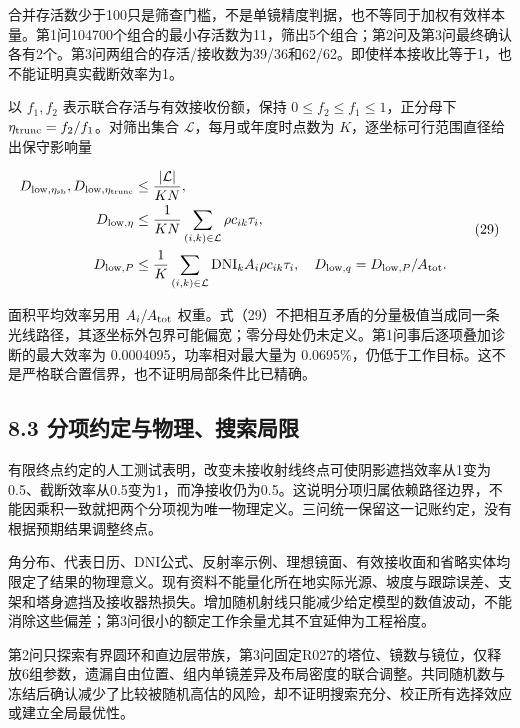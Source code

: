 \documentclass[UTF8,fontset=windows,zihao=-4]{ctexart}
\begin{document}
合并存活数少于100只是筛查门槛，不是单镜精度判据，也不等同于加权有效样本量。第1问104700个组合的最小存活数为11，筛出5个组合；第2问及第3问最终确认各有2个。第3问两组合的存活/接收数为39/36和62/62。即使样本接收比等于1，也不能证明真实截断效率为1。

\par\noindent\begin{minipage}{\linewidth}
以 \(f_1,f_2\) 表示联合存活与有效接收份额，保持 \(0\le f_2\le f_1\le1\)，正分母下 \(\eta_{\rm trunc}=f_2/f_1\)。对筛出集合 \(\mathcal L\)，每月或年度时点数为 \(K\)，逐坐标可行范围直径给出保守影响量

\[
\begin{aligned}
D_{{\rm low},\eta_{\rm sb}},D_{{\rm low},\eta_{\rm trunc}}&\le\frac{|\mathcal L|}{KN},\\
D_{{\rm low},\eta}&\le\frac1{KN}\sum_{(i,k)\in\mathcal L}\rho c_{ik}\tau_i,\\
D_{{\rm low},P}&\le\frac1K\sum_{(i,k)\in\mathcal L}\mathrm{DNI}_kA_i\rho c_{ik}\tau_i,
\quad D_{{\rm low},q}=D_{{\rm low},P}/A_{\rm tot}.
\end{aligned}\tag{29}
\]
\end{minipage}\par

面积平均效率另用 \(A_i/A_{\rm tot}\) 权重。式（29）不把相互矛盾的分量极值当成同一条光线路径，其逐坐标外包界可能偏宽；零分母处仍未定义。第1问事后逐项叠加诊断的最大效率为 0.0004095，功率相对最大量为 0.0695\%，仍低于工作目标。这不是严格联合置信界，也不证明局部条件比已精确。

\subsection*{8.3 分项约定与物理、搜索局限}

有限终点约定的人工测试表明，改变未接收射线终点可使阴影遮挡效率从1变为0.5、截断效率从0.5变为1，而净接收仍为0.5。这说明分项归属依赖路径边界，不能因乘积一致就把两个分项视为唯一物理定义。三问统一保留这一记账约定，没有根据预期结果调整终点。

角分布、代表日历、DNI公式、反射率示例、理想镜面、有效接收面和省略实体均限定了结果的物理意义。现有资料不能量化所在地实际光源、坡度与跟踪误差、支架和塔身遮挡及接收器热损失。增加随机射线只能减少给定模型的数值波动，不能消除这些偏差；第3问很小的额定工作余量尤其不宜延伸为工程裕度。

第2问只探索有界圆环和直边层带族，第3问固定R027的塔位、镜数与镜位，仅释放6组参数，遗漏自由位置、组内单镜差异及布局密度的联合调整。共同随机数与冻结后确认减少了比较被随机高估的风险，却不证明搜索充分、校正所有选择效应或建立全局最优性。
\end{document}
